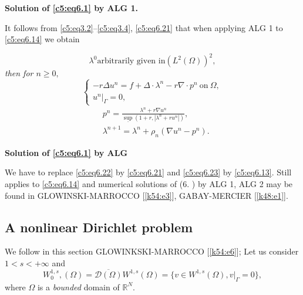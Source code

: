 \medskip
\noindent
 \textbf{Solution of \eqref{c5:eq6.1} by ALG 1.}
 
It follows from \eqref{c5:eq3.2}--\eqref{c5:eq3.4}, \eqref{c5:eq6.21} 
that when applying ALG 1 to \eqref{c5:eq6.14} we obtain  
 
\begin{equation}
\lambda^0 \text{arbitrarily given in} (L^2(\Omega ))^2,  
\tag{6.22}\label{c5:eq6.22} 
 \end{equation} 
 \textit{then for $n\geq0, $}
 \begin{equation}
\begin{cases}
-r \Delta u^n = f + \Delta \cdot \lambda^n - r \nabla \cdot p^n 
~\text{on}~\Omega,\\ 
u^n | _\Gamma = 0, \tag{6.23}\label{c5:eq6.23}
\end{cases}
 \end{equation} 
 \begin{align*}
&p^n = \frac{\lambda^n + r \nabla u^n}{\underline{\sup} (1 + r, 
| \lambda^n + r u^n |)}, \tag{6.24}\label{c5:eq6.24}\\ 
&\lambda^{n + 1} = \lambda^n + \rho_n (\nabla u^n - p^n). 
\tag{6.25}\label{c5:eq6.25} 
\end{align*} 

\noindent \textbf{Solution of \eqref{c5:eq6.1} by ALG}

We have to replace \eqref{c5:eq6.22} by \eqref{c5:eq6.21} and 
\eqref{c5:eq6.23} by \eqref{c5:eq6.13}. Still applies to 
\eqref{c5:eq6.14} and numerical solutions of (6. ) by ALG 1,  ALG 2 may 
be found in GLOWINSKI-MARROCCO [\ref{k54:e3}],  GABAY-MERCIER
[\ref{k48:e1}].     
 
\subsection{A nonlinear Dirichlet problem}\label{c5:ss6.3}%
 
 We follow in this section GLOWINKSKI-MARROCCO [\ref{k54:e6}]; Let us
 consider $1 < s < + \infty$ and  
 $$
 W^{1, s}_0,(\Omega ) = \overline{\mathscr{D}(\Omega)} W^{1, s}
 (\Omega) = \{v \in  W^{1, s} (\Omega ),  v |_\Gamma = 0 \},  
 $$
 where $\Omega$ is a \textit{bounded} domain of $\mathbb{R}^N$.  
 
